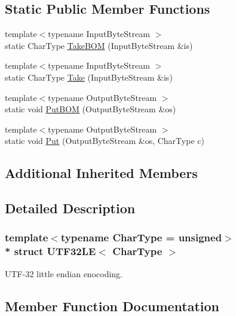 \subsection*{Static Public Member Functions}
\begin{DoxyCompactItemize}
\item 
{\footnotesize template$<$typename Input\+Byte\+Stream $>$ }\\static Char\+Type \hyperlink{structUTF32LE_a8729612b0a8b1126c61c4f8f8c34410e}{Take\+B\+OM} (Input\+Byte\+Stream \&is)
\item 
{\footnotesize template$<$typename Input\+Byte\+Stream $>$ }\\static Char\+Type \hyperlink{structUTF32LE_ad13967549811be12897362bb37b2c819}{Take} (Input\+Byte\+Stream \&is)
\item 
{\footnotesize template$<$typename Output\+Byte\+Stream $>$ }\\static void \hyperlink{structUTF32LE_accd97d45e55746c900dab356605825be}{Put\+B\+OM} (Output\+Byte\+Stream \&os)
\item 
{\footnotesize template$<$typename Output\+Byte\+Stream $>$ }\\static void \hyperlink{structUTF32LE_a61bb50e7fba27e3fe28a9f30eb366193}{Put} (Output\+Byte\+Stream \&os, Char\+Type c)
\end{DoxyCompactItemize}
\subsection*{Additional Inherited Members}


\subsection{Detailed Description}
\subsubsection*{template$<$typename Char\+Type = unsigned$>$\\*
struct U\+T\+F32\+L\+E$<$ Char\+Type $>$}

U\+T\+F-\/32 little endian enocoding. 

\subsection{Member Function Documentation}
